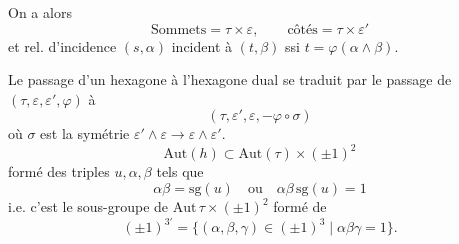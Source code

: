 \documentclass[11pt,a4paper]{article}
\begin{document}
On a alors
\[
  \text{Sommets} = \tau \times \varepsilon, \qquad \text{côtés} = \tau \times \varepsilon'
\]
et rel. d'incidence $(s,\alpha)$ incident à $(t,\beta)$ ssi \struck{\ill{}} $t = \varphi(\alpha \wedge \beta)$.

Le passage d'un hexagone à l'hexagone dual se traduit par le passage de $(\tau, \varepsilon, \varepsilon', \varphi)$ à
\[
  (\tau, \varepsilon', \varepsilon, -\varphi \circ \sigma)
\]
où $\sigma$ est la symétrie $\varepsilon' \wedge \varepsilon \to \varepsilon \wedge \varepsilon'$.
\[
  \mathrm{Aut}(h) \subset \mathrm{Aut}(\tau) \times (\pm 1)^2
\]
 formé des triples $u, \alpha, \beta$ tels que
\[
  \alpha\beta = \mathrm{sg}(u) \quad\text{ou}\quad \alpha\beta\,\mathrm{sg}(u) = 1
\]
i.e. c'est le sous-groupe de $\mathrm{Aut}\,\tau \times (\pm 1)^2$ formé   de
\[
  (\pm 1)^{3\prime} = \{ (\alpha,\beta,\gamma) \in (\pm 1)^3 \mid \alpha\beta\gamma = 1 \}.
\]
\end{document}
